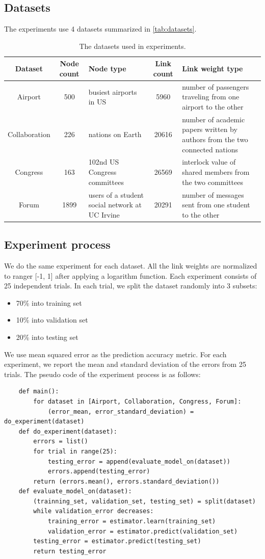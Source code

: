 \documentclass[letterpaper]{article}
\begin{document}
\subsection{Datasets}
The experiments use 4 datasets summarized in \autoref{tab:datasets}.
\begin{table}[!htb]\centering
	\caption{The datasets used in experiments.}
	\begin{tabularx}{\textwidth}{|c|c|X|c|X|}  \hline \rowcolor{blue!50}
		Dataset & Node count & Node type & Link count & Link weight type \\ \hline
		Airport\cite{colizza2007reaction} & 500 & busiest airports in US & 5960 & number of passengers traveling from one airport to the other\\ \hline
		Collaboration\cite{pan2012world} & 226 & nations on Earth & 20616 & number of academic papers written by authors from the two connected nations \\ \hline
		Congress\cite{porter2005network} & 163  & 102nd US Congress committees & 26569 & interlock value of shared members from the two committees \\ \hline
		Forum\cite{opsahl2009clustering}  & 1899 & users of a student social network at UC Irvine & 20291 & number of messages sent from one student to the other \\ \hline
	\end{tabularx}
	\label{tab:datasets}
\end{table}

\subsection{Experiment process}
We do the same experiment for each dataset.
All the link weights are normalized to ranger [-1, 1] after applying a logarithm function.
Each experiment consists of 25 independent trials.
In each trial, we split the dataset randomly into 3 subsets:
\begin{itemize}
	\item 70\% into training set
	\item 10\% into validation set
	\item 20\% into testing set
\end{itemize}
We use mean squared error as the prediction accuracy metric.
For each experiment, we report the mean and standard deviation of the errors from 25 trials.
The pseudo code of the experiment process is as follows:

\begin{lstlisting}
	def main():
		for dataset in [Airport, Collaboration, Congress, Forum]:
			(error_mean, error_standard_deviation) = do_experiment(dataset)
	def do_experiment(dataset):
		errors = list()
		for trial in range(25):
			testing_error = append(evaluate_model_on(dataset))
			errors.append(testing_error)
		return (errors.mean(), errors.standard_deviation())
	def evaluate_model_on(dataset):
		(trainning_set, validation_set, testing_set) = split(dataset)
		while validation_error decreases:
			training_error = estimator.learn(training_set)
			validation_error = estimator.predict(validation_set)
		testing_error = estimator.predict(testing_set)
		return testing_error
\end{lstlisting}
\end{document}
